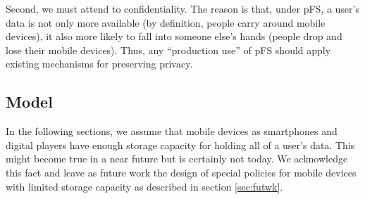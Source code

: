 Second, we must attend to confidentiality. The reason is that, under
pFS, a user's data is not only more available (by definition, people
carry around mobile devices), it also more likely to fall into someone
else's hands (people drop and lose their mobile devices). Thus, any
``production use'' of pFS should apply existing mechanisms for
preserving privacy. 

\subsection {Model}
\label{sec:model_mob}

In the following sections, we assume that mobile devices as
smartphones and digital players have enough storage capacity for
holding all of a user's data. This might become true in a near future
but is certainly not today. We acknowledge this fact and leave as
future work the design of special policies for mobile devices with
limited storage capacity as described in section \ref{sec:futwk}.

\endinput


